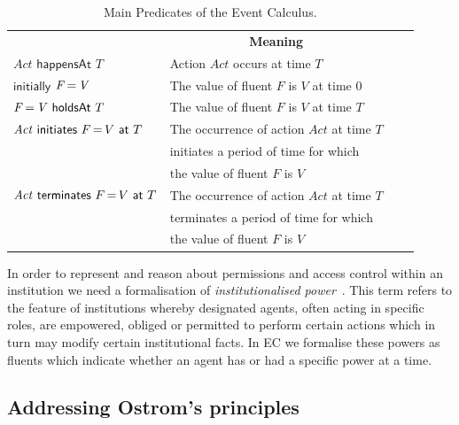 \begin{table}[htbp]
\caption{Main Predicates  of the Event Calculus.}\label{table:ec}
\begin{center}
\renewcommand{\arraystretch}{0.9}
\setlength\tabcolsep{3pt}
\begin{tabular}{llcc}
\hline\noalign{\smallskip}
\multicolumn{1}{c}{\textbf{Predicate}} & \multicolumn{1}{c}{\textbf{Meaning}}  \\
\noalign{\smallskip}
\hline
\noalign{\smallskip}
$\mathit{Act} \,\, \mathsf{happensAt} \,\, T $ & Action $\mathit{Act}$ occurs at time $T$  \\[2pt]
$\mathsf{initially}$ $\mathit{F \operatorname{=} V}$ & The value of fluent $F$ is $V$ at time $0$  \\[2pt] 
$\mathit{F \operatorname{=} V} \,\, \mathsf{holdsAt} \,\, T$ & The value of fluent $F$ is $V$ at time $T$ 
\\[2pt] 
$\mathit{Act} \,\, \mathsf{initiates} \,\, F \operatorname{=} V \,\, \mathsf{at} \,\, T$ & The occurrence of action $\mathit{Act}$ at time $T$ \\ 
& initiates a period of time for which \\
& the value of fluent $F$ is $V$ \\[2pt] 
$\mathit{Act} \,\, \mathsf{terminates} \,\, F \operatorname{=} V \,\, \mathsf{at} \,\, T$ & The occurrence of action $\mathit{Act}$ at time $T$ \\
& terminates a period of time for which \\
& the value of fluent $F$ is $V$  \\
\hline
\end{tabular}
\end{center}
\end{table}

In order to represent and reason about permissions and access control within an institution we need a formalisation of \emph{institutionalised power}~\citep{Jones1996}. 
This term refers to the feature of institutions whereby designated agents, often acting in specific roles, are empowered, obliged or permitted to perform certain actions which in turn may modify certain institutional facts. 
In EC we formalise these powers as fluents which indicate whether an agent has or had a specific power at a time.

\subsection{Addressing Ostrom's principles}
%

